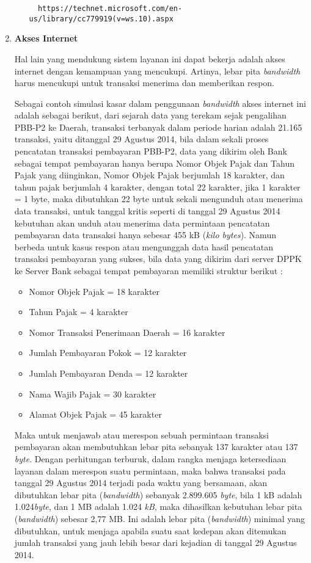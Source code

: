 \documentclass[pdftex,12pt, oneside]{article}
\begin{document}
\begin{enumerate}
\begin{enumerate}
  \begin{verbatim}
  https://technet.microsoft.com/en-us/library/cc779919(v=ws.10).aspx
  \end{verbatim}
  
\end{enumerate}

\item \textbf{Akses Internet}

Hal lain yang mendukung sistem layanan ini dapat bekerja adalah akses internet dengan kemampuan yang mencukupi. Artinya, lebar pita \textit{bandwidth} harus mencukupi untuk transaksi menerima dan memberikan respon.

Sebagai contoh simulasi kasar dalam penggunaan \textit{bandwidth} akses internet ini adalah sebagai berikut, dari sejarah data yang terekam sejak pengalihan PBB-P2 ke Daerah, transaksi terbanyak dalam periode harian adalah 21.165 transaksi, yaitu ditanggal 29 Agustus 2014, bila dalam sekali proses pencatatan transaksi pembayaran PBB-P2, data yang dikirim oleh Bank sebagai tempat pembayaran hanya berupa Nomor Objek Pajak dan Tahun Pajak yang diinginkan, Nomor Objek Pajak berjumlah 18 karakter, dan tahun pajak berjumlah 4 karakter, dengan total 22 karakter, jika 1 karakter = 1 byte, maka dibutuhkan 22 byte untuk sekali mengunduh atau menerima data transaksi, untuk tanggal kritis seperti di tanggal 29 Agustus 2014 kebutuhan akan unduh atau menerima data permintaan pencatatan pembayaran data transaksi hanya sebesar 455 kB (\textit{kilo bytes}). Namun berbeda untuk kasus respon atau mengunggah data hasil pencatatan transaksi pembayaran yang sukses, bila data yang dikirim dari server DPPK ke Server Bank sebagai tempat pembayaran memiliki struktur berikut :

\begin{itemize}
  \item Nomor Objek Pajak = 18 karakter
  \item Tahun Pajak = 4 karakter
  \item Nomor Transaksi Penerimaan Daerah = 16 karakter
  \item Jumlah Pembayaran Pokok = 12 karakter
  \item Jumlah Pembayaran Denda = 12 karakter
  \item Nama Wajib Pajak = 30 karakter
  \item Alamat Objek Pajak = 45 karakter
\end{itemize}

Maka untuk menjawab atau merespon sebuah permintaan transaksi pembayaran akan membutuhkan lebar pita sebanyak 137 karakter atau 137 \textit{byte}. Dengan perhitungan terburuk, dalam rangka menjaga ketersediaan layanan dalam merespon suatu permintaan, maka bahwa transaksi pada tanggal 29 Agustus 2014 terjadi pada waktu yang bersamaan, akan dibutuhkan lebar pita (\textit{bandwidth}) sebanyak 2.899.605 \textit{byte}, bila 1 kB adalah 1.024\textit{byte}, dan 1 MB adalah 1.024 \textit{kB}, maka dihasilkan kebutuhan lebar pita (\textit{bandwidth}) sebesar 2,77 MB. Ini adalah lebar pita (\textit{bandwidth}) minimal yang dibutuhkan, untuk menjaga apabila suatu saat kedepan akan ditemukan jumlah transaksi yang jauh lebih besar dari kejadian di tanggal 29 Agustus 2014.


\end{enumerate}
\end{document}

